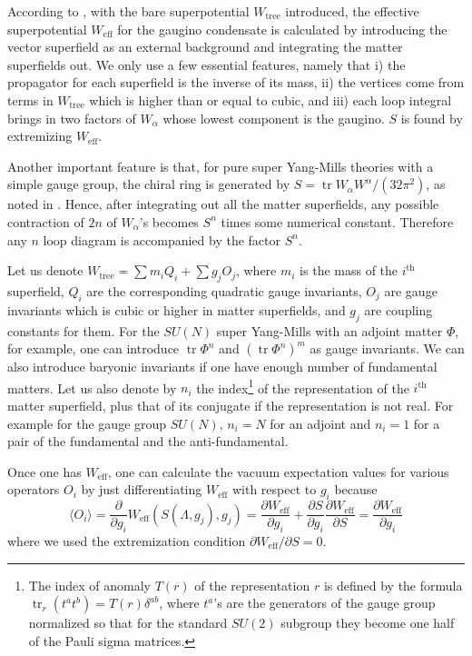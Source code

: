\documentclass[a4paper,12pt]{article}
\def\ex#1{\langle#1\rangle}
\def\W#1{W_{\text{#1}}}
\def\tr{\mathop{\text{tr}}}
\def\SU{SU}
\begin{document}
According to \cite{Dijkgraaf:2002xd},
with the bare superpotential $\W{tree}$ introduced,
the effective superpotential $\W{eff}$ for the gaugino condensate
is calculated by introducing the vector superfield as an external
background and integrating the matter superfields out.
We only use a few essential features, namely  that
i) the propagator for each superfield is the inverse of its mass,
ii) the vertices come from terms in $\W{tree}$ which is higher than
or equal to cubic,
and iii) each loop integral brings in two factors of $W_\alpha$ whose
lowest component is the gaugino. $S$ is found by extremizing $\W{eff}$.

Another important feature is that, for pure super Yang-Mills theories
with a simple gauge group, the chiral ring is generated
by $S=\tr W_\alpha W^\alpha/(32\pi^2)$, as noted in \cite{Cachazo:2002ry}.
Hence, after integrating out all the matter superfields,
any possible contraction of $2n$ of $W_\alpha$'s becomes $S^n$ times
some numerical constant. Therefore any $n$ loop diagram is accompanied by
the factor $S^n$.

Let us denote $\W{tree}=\sum m_iQ_i+\sum g_jO_j$,
where $m_i$ is the mass of the $i^{\text{th}}$ superfield,
$Q_i$ are the corresponding quadratic gauge invariants,
$O_j$ are gauge invariants which is cubic or higher in matter superfields,
and $g_j$ are coupling constants for them.
For the $\SU(N)$ super Yang-Mills with an adjoint matter $\Phi$, for example,
one can introduce $\tr \Phi^n$ and $(\tr \Phi^n)^m$ as gauge invariants.
We can also introduce baryonic invariants if one have
enough number of fundamental matters.
Let us also denote by $n_i$ the index\footnote{%
The index of anomaly $T(r)$ of the representation $r$ is defined by the formula
$\tr_r(t^at^b)=T(r)\delta^{ab}$, where $t^a$'s are the generators of the
gauge group normalized so that for the standard $SU(2)$ subgroup
they become one half of the Pauli sigma matrices.
} of the representation of the
$i^{\text{th}}$ matter superfield, plus that of its conjugate if
the representation is not real.
For example for the gauge group $SU(N)$, 
$n_i=N$ for an adjoint and
$n_i=1$ for a pair of the fundamental and the anti-fundamental.

Once one has $\W{eff}$, 
one can calculate
the vacuum expectation values for various operators $O_i$ by
just differentiating $\W{eff}$ with respect to $g_i$ because\begin{equation}
\ex{O_i}=\frac{\partial}{\partial g_i}
\W{eff}(S(\Lambda,g_j),g_j)
=\frac{\partial\W{eff}}{\partial g_i}+\frac{\partial S}{\partial g_i}
\frac{\partial\W{eff}}{\partial S}
=\frac{\partial\W{eff}}{\partial g_i}
\end{equation}
where we used the extremization condition $\partial\W{eff}/\partial S=0$.
\end{document}
